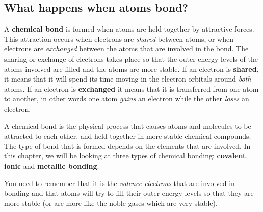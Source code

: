             \subsection*{What happens when atoms bond?}
            \nopagebreak
      \label{m38704*id138842}A \textbf{chemical bond} is formed when atoms are held together by attractive forces. This attraction occurs when electrons are \textsl{shared} between atoms, or when electrons are \textsl{exchanged} between the atoms that are involved in the bond. The sharing or exchange of electrons takes place so that the outer energy levels of the atoms involved are filled and the atoms are more stable. If an electron is \textbf{shared}, it means that it will spend its time moving in the electron orbitals around \textsl{both} atoms. If an electron is \textbf{exchanged} it means that it is transferred from one atom to another, in other words one atom \textsl{gains} an electron while the other \textsl{loses} an electron.\par 
\label{m38704*fhsst!!!underscore!!!id83}
 {\label{m38704*meaningfhsst!!!underscore!!!id83} A chemical bond is the physical process that causes atoms and molecules to be attracted to each other, and held together in more stable chemical compounds.} 
      \label{m38704*id138909}The type of bond that is formed depends on the elements that are involved. In this chapter, we will be looking at three types of chemical bonding: \textbf{covalent}, \textbf{ionic} and \textbf{metallic bonding}.\par 
      \label{m38704*id138929}You need to remember that it is the \textsl{valence electrons} that are involved in bonding and that atoms will try to fill their outer energy levels so that they are more stable (or are more like the noble gases which are very stable).\par 
